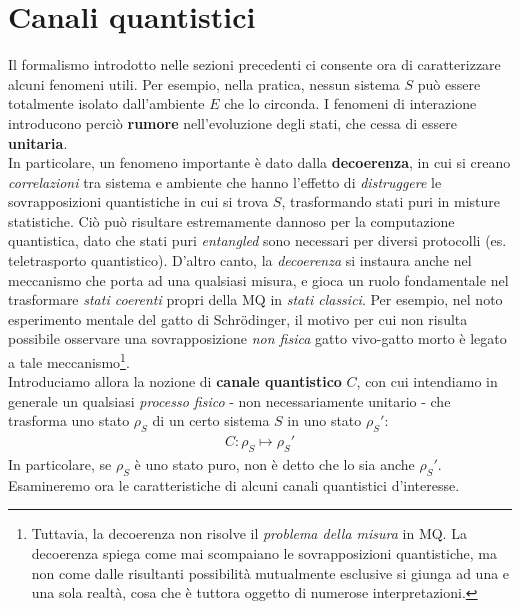 \documentclass[../../InformazioneQuantistica.tex]{subfiles}
\begin{document}
\section{Canali quantistici}
Il formalismo introdotto nelle sezioni precedenti ci consente ora di caratterizzare alcuni fenomeni utili. Per esempio, nella pratica, nessun sistema $S$ può essere totalmente isolato dall'ambiente $E$ che lo circonda. I fenomeni di interazione introducono perciò \textbf{rumore} nell'evoluzione degli stati, che cessa di essere \textbf{unitaria}.\\
In particolare, un fenomeno importante è dato dalla \textbf{decoerenza}, in cui si creano \textit{correlazioni} tra sistema e ambiente che hanno l'effetto di \textit{distruggere} le sovrapposizioni quantistiche in cui si trova $S$, trasformando stati puri in misture statistiche. Ciò può risultare estremamente dannoso per la computazione quantistica, dato che stati puri \textit{entangled} sono necessari per diversi protocolli (es. teletrasporto quantistico). D'altro canto, la \textit{decoerenza} si instaura anche nel meccanismo che porta ad una qualsiasi misura, e gioca un ruolo fondamentale nel trasformare \textit{stati coerenti} propri della MQ in \textit{stati classici}. Per esempio, nel noto esperimento mentale del gatto di Schr\"odinger, il motivo per cui non risulta possibile osservare una sovrapposizione \textit{non fisica} gatto vivo-gatto morto è legato a tale meccanismo\footnote{Tuttavia, la decoerenza non risolve il \textit{problema della misura} in MQ. La decoerenza spiega come mai scompaiano le sovrapposizioni quantistiche, ma non come dalle risultanti possibilità mutualmente esclusive si giunga ad una e una sola realtà, cosa che è tuttora oggetto di numerose interpretazioni.}.\\

Introduciamo allora la nozione di \textbf{canale quantistico} $C$, con cui intendiamo in generale un qualsiasi \textit{processo fisico} - non necessariamente unitario - che trasforma uno stato $\rho_S$ di un certo sistema $S$ in uno stato $\rho_S'$:
\begin{align*}
    C: \rho_S \mapsto \rho_S'
\end{align*}
In particolare, se $\rho_S$ è uno stato puro, non è detto che lo sia anche $\rho_S'$.\\
Esamineremo ora le caratteristiche di alcuni canali quantistici d'interesse.
\end{document}
